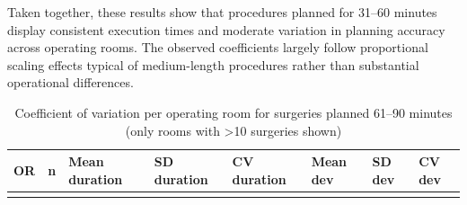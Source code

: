 \documentclass[
]{article}
\begin{document}
Taken together, these results show that procedures planned for 31--60
minutes display consistent execution times and moderate variation in
planning accuracy across operating rooms. The observed coefficients
largely follow proportional scaling effects typical of medium-length
procedures rather than substantial operational differences.

\begin{longtable}[]{@{}
  >{\centering\arraybackslash}p{}
  >{\centering\arraybackslash}p{}
  >{\centering\arraybackslash}p{}
  >{\centering\arraybackslash}p{}
  >{\centering\arraybackslash}p{}
  >{\centering\arraybackslash}p{}
  >{\centering\arraybackslash}p{}
  >{\centering\arraybackslash}p{}@{}}
\caption{Coefficient of variation per operating room for surgeries
planned 61--90 minutes (only rooms with \textgreater10 surgeries shown)
\label{tab:cv_room_61_90}}\tabularnewline
\toprule\noalign{}
\begin{minipage}[b]{\linewidth}\centering
OR
\end{minipage} & \begin{minipage}[b]{\linewidth}\centering
n
\end{minipage} & \begin{minipage}[b]{\linewidth}\centering
Mean duration
\end{minipage} & \begin{minipage}[b]{\linewidth}\centering
SD duration
\end{minipage} & \begin{minipage}[b]{\linewidth}\centering
CV duration
\end{minipage} & \begin{minipage}[b]{\linewidth}\centering
Mean dev
\end{minipage} & \begin{minipage}[b]{\linewidth}\centering
SD dev
\end{minipage} & \begin{minipage}[b]{\linewidth}\centering
CV dev
\end{minipage} \\
\midrule\noalign{}
\endfirsthead
\toprule\noalign{}
\begin{minipage}[b]{\linewidth}\centering

\end{minipage}
\end{longtable}
\end{document}
